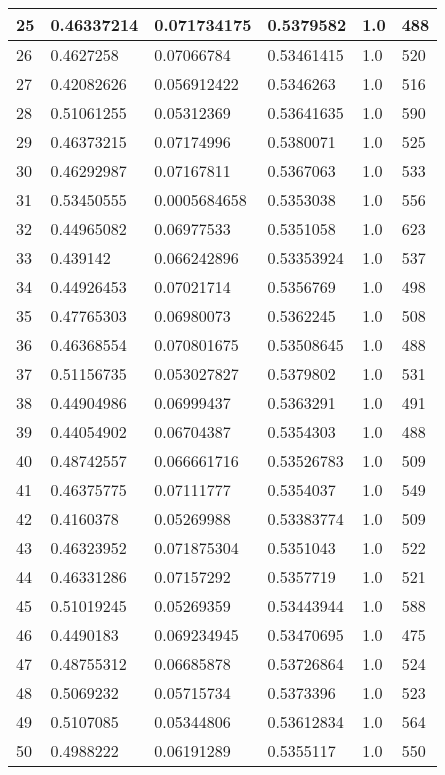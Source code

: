 \begin{longtable}{|l|l|l|l|l|l|}
25 & 0.46337214 & 0.071734175 & 0.5379582 & 1.0 & 488 \\ \hline 
26 & 0.4627258 & 0.07066784 & 0.53461415 & 1.0 & 520 \\ \hline 
27 & 0.42082626 & 0.056912422 & 0.5346263 & 1.0 & 516 \\ \hline 
28 & 0.51061255 & 0.05312369 & 0.53641635 & 1.0 & 590 \\ \hline 
29 & 0.46373215 & 0.07174996 & 0.5380071 & 1.0 & 525 \\ \hline 
30 & 0.46292987 & 0.07167811 & 0.5367063 & 1.0 & 533 \\ \hline 
31 & 0.53450555 & 0.0005684658 & 0.5353038 & 1.0 & 556 \\ \hline 
32 & 0.44965082 & 0.06977533 & 0.5351058 & 1.0 & 623 \\ \hline 
33 & 0.439142 & 0.066242896 & 0.53353924 & 1.0 & 537 \\ \hline 
34 & 0.44926453 & 0.07021714 & 0.5356769 & 1.0 & 498 \\ \hline 
35 & 0.47765303 & 0.06980073 & 0.5362245 & 1.0 & 508 \\ \hline 
36 & 0.46368554 & 0.070801675 & 0.53508645 & 1.0 & 488 \\ \hline 
37 & 0.51156735 & 0.053027827 & 0.5379802 & 1.0 & 531 \\ \hline 
38 & 0.44904986 & 0.06999437 & 0.5363291 & 1.0 & 491 \\ \hline 
39 & 0.44054902 & 0.06704387 & 0.5354303 & 1.0 & 488 \\ \hline 
40 & 0.48742557 & 0.066661716 & 0.53526783 & 1.0 & 509 \\ \hline 
41 & 0.46375775 & 0.07111777 & 0.5354037 & 1.0 & 549 \\ \hline 
42 & 0.4160378 & 0.05269988 & 0.53383774 & 1.0 & 509 \\ \hline 
43 & 0.46323952 & 0.071875304 & 0.5351043 & 1.0 & 522 \\ \hline 
44 & 0.46331286 & 0.07157292 & 0.5357719 & 1.0 & 521 \\ \hline 
45 & 0.51019245 & 0.05269359 & 0.53443944 & 1.0 & 588 \\ \hline 
46 & 0.4490183 & 0.069234945 & 0.53470695 & 1.0 & 475 \\ \hline 
47 & 0.48755312 & 0.06685878 & 0.53726864 & 1.0 & 524 \\ \hline 
48 & 0.5069232 & 0.05715734 & 0.5373396 & 1.0 & 523 \\ \hline 
49 & 0.5107085 & 0.05344806 & 0.53612834 & 1.0 & 564 \\ \hline 
50 & 0.4988222 & 0.06191289 & 0.5355117 & 1.0 & 550 \\ \hline 
\end{longtable}